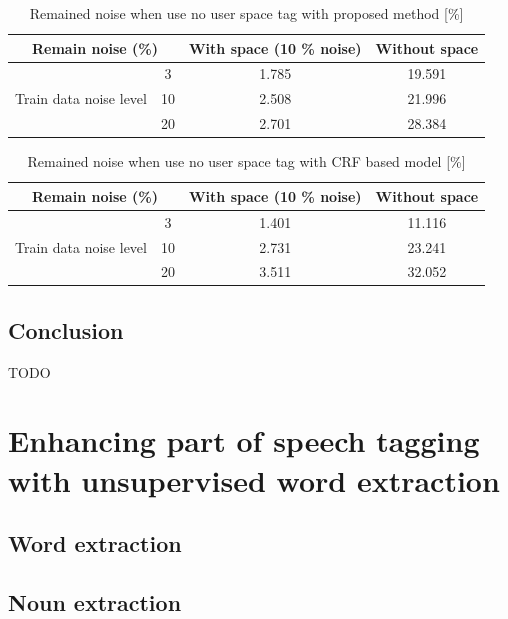 \documentclass[11pt]{article}
\begin{document}
\begin{table}[H]
\centering
\label{tab:no_use_user_space_proposed}
\caption{Remained noise when use no user space tag with proposed method [\%]}
\begin{tabular}{|c|c|c|c|}
\hline
\multicolumn{2}{|c|}{Remain noise (\%)} & With space (10 \% noise) & Without space \\ \hline
\multirow{3}{*}{Train data noise level} & 3 & 1.785 & 19.591 \\ \cline{2-4} 
 & 10 & 2.508 & 21.996 \\ \cline{2-4} 
 & 20 & 2.701 & 28.384 \\ \hline
\end{tabular}
\end{table}

\begin{table}[H]
\centering
\label{tab:no_use_user_space_crf}
\caption{Remained noise when use no user space tag with CRF based model [\%]}
\begin{tabular}{|c|c|c|c|}
\hline
\multicolumn{2}{|c|}{Remain noise (\%)} & With space (10 \% noise) & Without space \\ \hline
\multirow{3}{*}{Train data noise level} & 3 & 1.401 & 11.116 \\ \cline{2-4} 
 & 10 & 2.731 & 23.241 \\ \cline{2-4} 
 & 20 & 3.511 & 32.052 \\ \hline
\end{tabular}
\end{table}

\subsection{Conclusion}

TODO


\section{Enhancing part of speech tagging with unsupervised word extraction}

\subsection{Word extraction}


\subsection{Noun extraction}
\end{document}
